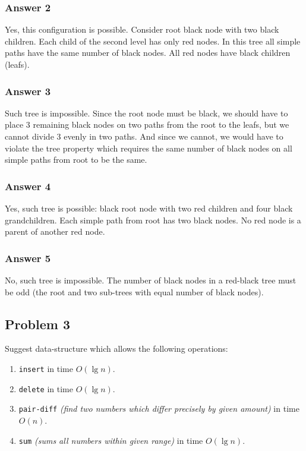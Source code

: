 \documentclass[11pt]{article}
\begin{document}
\subsubsection{Answer 2}
\label{sec-1-2-1}
Yes, this configuration is possible.  Consider root black node with two
black children.  Each child of the second level has only red nodes.  In this
tree all simple paths have the same number of black nodes.  All red nodes
have black children (leafs).

\subsubsection{Answer 3}
\label{sec-1-2-2}
Such tree is impossible.  Since the root node must be black, we should have
to place 3 remaining black nodes on two paths from the root to the leafs,
but we cannot divide 3 evenly in two paths.  And since we cannot, we would
have to violate the tree property which requires the same number of black
nodes on all simple paths from root to be the same.

\subsubsection{Answer 4}
\label{sec-1-2-3}
Yes, such tree is possible: black root node with two red children and four
black grandchildren.  Each simple path from root has two black nodes.  No
red node is a parent of another red node.

\subsubsection{Answer 5}
\label{sec-1-2-4}
No, such tree is impossible.  The number of black nodes in a red-black tree
must be odd (the root and two sub-trees with equal number of black nodes).

\subsection{Problem 3}
\label{sec-1-3}
Suggest data-structure which allows the following operations:
\begin{enumerate}
\item \texttt{insert} in time $O(\lg n)$.
\item \texttt{delete} in time $O(\lg n)$.
\item \texttt{pair-diff} \emph{(find two numbers which differ precisely by given amount)}
      in time $O(n)$.
\item \texttt{sum} \emph{(sums all numbers within given range)} in time $O(\lg n)$.
\end{enumerate}
\end{document}
